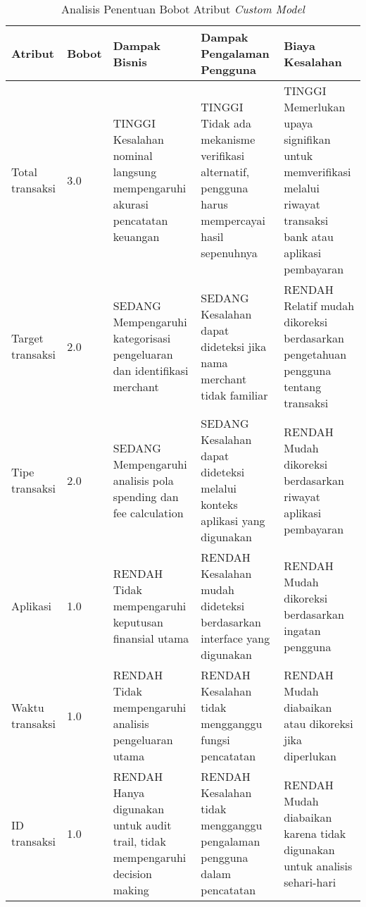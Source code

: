\begin{table}[h!]
    \centering
    \caption{Analisis Penentuan Bobot Atribut \emph{Custom Model}}
    \label{tab:risk-impact-custom-model}
    \begin{tabularx}{\textwidth}{|p{1.5cm}|p{1cm}|X|X|X|}
        \hline
        \textbf{Atribut} & \textbf{Bobot} & \textbf{Dampak Bisnis} & \textbf{Dampak Pengalaman Pengguna} & \textbf{Biaya Kesalahan} \\ \hline
        Total transaksi & 3.0 & TINGGI \newline Kesalahan nominal langsung mempengaruhi akurasi pencatatan keuangan & TINGGI \newline Tidak ada mekanisme verifikasi alternatif, pengguna harus mempercayai hasil sepenuhnya & TINGGI \newline Memerlukan upaya signifikan untuk memverifikasi melalui riwayat transaksi bank atau aplikasi pembayaran \\ \hline
        Target transaksi & 2.0 & SEDANG \newline  Mempengaruhi kategorisasi pengeluaran dan identifikasi merchant & SEDANG \newline  Kesalahan dapat dideteksi jika nama merchant tidak familiar & RENDAH \newline  Relatif mudah dikoreksi berdasarkan pengetahuan pengguna tentang transaksi \\ \hline
        Tipe transaksi & 2.0 & SEDANG \newline  Mempengaruhi analisis pola spending dan fee calculation & SEDANG \newline  Kesalahan dapat dideteksi melalui konteks aplikasi yang digunakan & RENDAH \newline  Mudah dikoreksi berdasarkan riwayat aplikasi pembayaran \\ \hline
        Aplikasi & 1.0 & RENDAH \newline  Tidak mempengaruhi keputusan finansial utama & RENDAH \newline Kesalahan mudah dideteksi berdasarkan interface yang digunakan & RENDAH \newline  Mudah dikoreksi berdasarkan ingatan pengguna \\ \hline
        Waktu transaksi & 1.0 & RENDAH \newline  Tidak mempengaruhi analisis pengeluaran utama & RENDAH \newline  Kesalahan tidak mengganggu fungsi pencatatan & RENDAH \newline  Mudah diabaikan atau dikoreksi jika diperlukan \\ \hline
        ID transaksi & 1.0 & RENDAH \newline  Hanya digunakan untuk audit trail, tidak mempengaruhi decision making & RENDAH \newline  Kesalahan tidak mengganggu pengalaman pengguna dalam pencatatan & RENDAH \newline  Mudah diabaikan karena tidak digunakan untuk analisis sehari-hari \\ \hline
    \end{tabularx}
\end{table}

